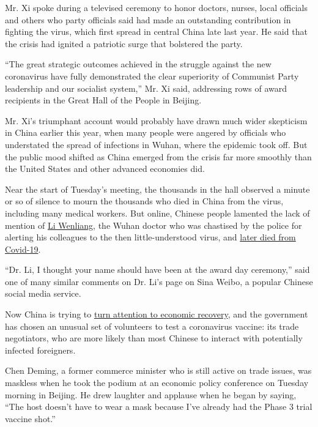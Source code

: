 Mr. Xi spoke during a televised ceremony to honor doctors, nurses, local
officials and others who party officials said had made an outstanding
contribution in fighting the virus, which first spread in central China
late last year. He said that the crisis had ignited a patriotic surge
that bolstered the party.

``The great strategic outcomes achieved in the struggle against the new
coronavirus have fully demonstrated the clear superiority of Communist
Party leadership and our socialist system,'' Mr. Xi said, addressing
rows of award recipients in the Great Hall of the People in Beijing.

Mr. Xi's triumphant account would probably have drawn much wider
skepticism in China earlier this year, when many people were angered by
officials who understated the spread of infections in Wuhan, where the
epidemic took off. But the public mood shifted as China emerged from the
crisis far more smoothly than the United States and other advanced
economies did.

Near the start of Tuesday's meeting, the thousands in the hall observed
a minute or so of silence to mourn the thousands who died in China from
the virus, including many medical workers. But online, Chinese people
lamented the lack of mention of
\href{https://www.nytimes3xbfgragh.onion/2020/02/07/world/asia/Li-Wenliang-china-coronavirus.html}{Li
Wenliang}, the Wuhan doctor who was chastised by the police for alerting
his colleagues to the then little-understood virus, and
\href{https://www.nytimes3xbfgragh.onion/2020/02/06/world/asia/chinese-doctor-Li-Wenliang-coronavirus.html}{later
died from Covid-19}.

``Dr. Li, I thought your name should have been at the award day
ceremony,'' said one of many similar comments on Dr. Li's page on Sina
Weibo, a popular Chinese social media service.

Now China is trying to
\href{https://www.nytimes3xbfgragh.onion/2020/09/07/business/china-xi-economy.html}{turn
attention to economic recovery}, and the government has chosen an
unusual set of volunteers to test a coronavirus vaccine: its trade
negotiators, who are more likely than most Chinese to interact with
potentially infected foreigners.

Chen Deming, a former commerce minister who is still active on trade
issues, was maskless when he took the podium at an economic policy
conference on Tuesday morning in Beijing. He drew laughter and applause
when he began by saying, ``The host doesn't have to wear a mask because
I've already had the Phase 3 trial vaccine shot.''

